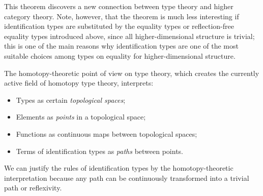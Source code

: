 \documentclass[11pt]{article}
\begin{document}
This theorem discovers a new connection between type theory and higher category theory. Note, however, that the theorem is much less interesting if identification types are substituted by the equality types or reflection-free equality types introduced above, since all higher-dimensional structure is trivial; this is one of the main reasons why identification types are one of the most suitable choices among types on equality for higher-dimensional structure.

The homotopy-theoretic point of view on type theory, which creates the currently active field of homotopy type theory, interprets:

\begin{itemize}
\item Types as certain \emph{topological spaces};
\item Elements as \emph{points} in a topological space;
\item Functions as continuous maps between topological spaces;
\item Terms of identification types as \emph{paths} between points.
\end{itemize}

We can justify the rules of identification types by the homotopy-theoretic interpretation because any path can be continuously transformed into a trivial path or reflexivity.

\printbibliography
\end{document}
